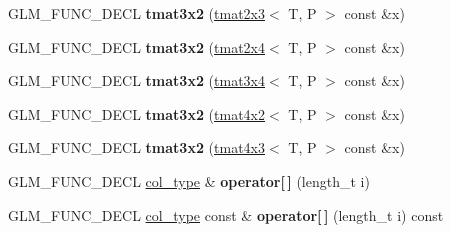 \begin{DoxyCompactItemize}
\item 
G\+L\+M\+\_\+\+F\+U\+N\+C\+\_\+\+D\+E\+CL {\bfseries tmat3x2} (\hyperlink{structglm_1_1detail_1_1tmat2x3}{tmat2x3}$<$ T, P $>$ const \&x)\hypertarget{structglm_1_1detail_1_1tmat3x2_a2accfb7c3f02afa377299db31c7ed798}{}\label{structglm_1_1detail_1_1tmat3x2_a2accfb7c3f02afa377299db31c7ed798}

\item 
G\+L\+M\+\_\+\+F\+U\+N\+C\+\_\+\+D\+E\+CL {\bfseries tmat3x2} (\hyperlink{structglm_1_1detail_1_1tmat2x4}{tmat2x4}$<$ T, P $>$ const \&x)\hypertarget{structglm_1_1detail_1_1tmat3x2_a00df9d2a64b9663eb5f15a39a4c7f9ec}{}\label{structglm_1_1detail_1_1tmat3x2_a00df9d2a64b9663eb5f15a39a4c7f9ec}

\item 
G\+L\+M\+\_\+\+F\+U\+N\+C\+\_\+\+D\+E\+CL {\bfseries tmat3x2} (\hyperlink{structglm_1_1detail_1_1tmat3x4}{tmat3x4}$<$ T, P $>$ const \&x)\hypertarget{structglm_1_1detail_1_1tmat3x2_a9bd5ce0d6f006d0e52867e4aaa847667}{}\label{structglm_1_1detail_1_1tmat3x2_a9bd5ce0d6f006d0e52867e4aaa847667}

\item 
G\+L\+M\+\_\+\+F\+U\+N\+C\+\_\+\+D\+E\+CL {\bfseries tmat3x2} (\hyperlink{structglm_1_1detail_1_1tmat4x2}{tmat4x2}$<$ T, P $>$ const \&x)\hypertarget{structglm_1_1detail_1_1tmat3x2_a7c8be95ce9c562abc043a0d97ef38d55}{}\label{structglm_1_1detail_1_1tmat3x2_a7c8be95ce9c562abc043a0d97ef38d55}

\item 
G\+L\+M\+\_\+\+F\+U\+N\+C\+\_\+\+D\+E\+CL {\bfseries tmat3x2} (\hyperlink{structglm_1_1detail_1_1tmat4x3}{tmat4x3}$<$ T, P $>$ const \&x)\hypertarget{structglm_1_1detail_1_1tmat3x2_a2e2513abd10a92e41c9b87e858fb4e1f}{}\label{structglm_1_1detail_1_1tmat3x2_a2e2513abd10a92e41c9b87e858fb4e1f}

\item 
G\+L\+M\+\_\+\+F\+U\+N\+C\+\_\+\+D\+E\+CL \hyperlink{structglm_1_1detail_1_1tvec2}{col\+\_\+type} \& {\bfseries operator\mbox{[}$\,$\mbox{]}} (length\+\_\+t i)\hypertarget{structglm_1_1detail_1_1tmat3x2_a8ffe61490e2ac7330fca4b01d4c8f6d3}{}\label{structglm_1_1detail_1_1tmat3x2_a8ffe61490e2ac7330fca4b01d4c8f6d3}

\item 
G\+L\+M\+\_\+\+F\+U\+N\+C\+\_\+\+D\+E\+CL \hyperlink{structglm_1_1detail_1_1tvec2}{col\+\_\+type} const \& {\bfseries operator\mbox{[}$\,$\mbox{]}} (length\+\_\+t i) const \hypertarget{structglm_1_1detail_1_1tmat3x2_a6a3310009ad79884e0ff33a5c61ac96b}{}\label{structglm_1_1detail_1_1tmat3x2_a6a3310009ad79884e0ff33a5c61ac96b}


\end{DoxyCompactItemize}
